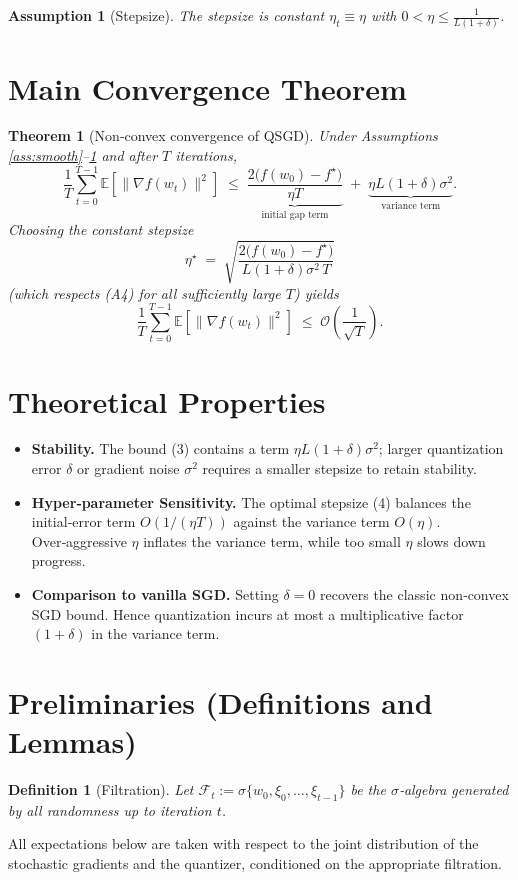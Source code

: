 \documentclass{article}
\newtheorem{theorem}{Theorem}
\newtheorem{assumption}{Assumption}
\newtheorem{definition}{Definition}
\begin{document}
\begin{assumption}[Stepsize]\label{ass:stepsize}
The stepsize is constant $\eta_t\equiv\eta$ with $0<\eta\le \frac{1}{L(1+\delta)}$.
\end{assumption}

\section*{Main Convergence Theorem}
\begin{theorem}[Non‑convex convergence of QSGD]\label{thm:main}
Under Assumptions \ref{ass:smooth}–\ref{ass:stepsize} and after $T$ iterations,
\[
\frac{1}{T}\sum_{t=0}^{T-1}\mathbb{E}\!\left[\|\nabla f(w_t)\|^2\right]
\;\le\;
\underbrace{\frac{2\bigl(f(w_0)-f^\star\bigr)}{\eta T}}_{\text{initial gap term}}
\;+\;
\underbrace{\eta L(1+\delta)\sigma^2}_{\text{variance term}} .
\tag{3}
\]
Choosing the constant stepsize
\[
\eta^\star \;=\; \sqrt{\frac{2\bigl(f(w_0)-f^\star\bigr)}{L(1+\delta)\sigma^2\,T}}
\tag{4}
\]
(which respects (A4) for all sufficiently large $T$) yields
\[
\frac{1}{T}\sum_{t=0}^{T-1}\mathbb{E}\!\left[\|\nabla f(w_t)\|^2\right]
\;\le\;
\mathcal{O}\!\left(\frac{1}{\sqrt{T}}\right).
\tag{5}
\]
\end{theorem}

\section*{Theoretical Properties}
\begin{itemize}
    \item \textbf{Stability.} The bound (3) contains a term $\eta L(1+\delta)\sigma^2$; larger quantization error $\delta$ or gradient noise $\sigma^2$ requires a smaller stepsize to retain stability.
    \item \textbf{Hyper‑parameter Sensitivity.} The optimal stepsize (4) balances the initial‑error term $O(1/(\eta T))$ against the variance term $O(\eta)$. Over‑aggressive $\eta$ inflates the variance term, while too small $\eta$ slows down progress.
    \item \textbf{Comparison to vanilla SGD.} Setting $\delta=0$ recovers the classic non‑convex SGD bound. Hence quantization incurs at most a multiplicative factor $(1+\delta)$ in the variance term.
\end{itemize}

\section*{Preliminaries (Definitions and Lemmas)}
\begin{definition}[Filtration]
Let $\mathcal{F}_t:=\sigma\{w_0,\xi_0,\dots,\xi_{t-1}\}$ be the $\sigma$‑algebra generated by all randomness up to iteration $t$.
\end{definition}
All expectations below are taken with respect to the joint distribution of the stochastic gradients and the quantizer, conditioned on the appropriate filtration.
\end{document}
